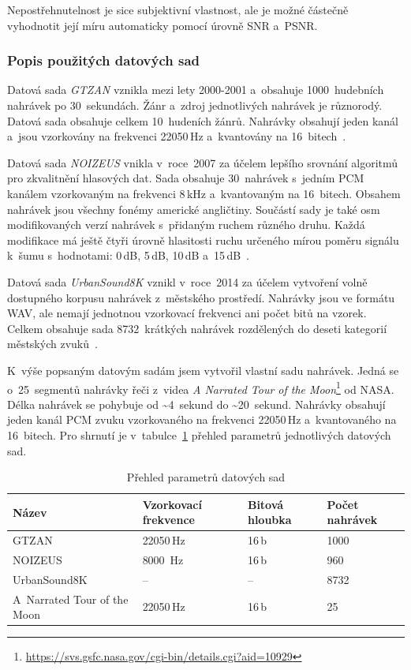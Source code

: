 \noindent Nepostřehnutelnost je sice subjektivní vlastnost, ale je možné
částečně vyhodnotit její míru automaticky pomocí úrovně SNR a~PSNR.

\subsubsection{Popis použitých datových sad}
\label{ssub:dataset-descriptions}

Datová sada \textit{GTZAN} vznikla mezi lety 2000-2001 a~obsahuje
1000~hudebních nahrávek po 30~sekundách. Žánr a~zdroj jednotlivých nahrávek je
různorodý. Datová sada obsahuje celkem 10~hudeních žánrů. Nahrávky obsahují
jeden kanál a~jsou vzorkovány na frekvenci 22050\,Hz a~kvantovány na
16~bitech~\cite{Tzanetakis2001}.

Datová sada \textit{NOIZEUS} vnikla v~roce~2007 za účelem lepšího srovnání
algoritmů pro zkvalitnění hlasových dat. Sada obsahuje 30~nahrávek s~jedním PCM
kanálem vzorkovaným na frekvenci 8\,kHz a~kvantovaným na 16~bitech. Obsahem
nahrávek jsou všechny fonémy americké angličtiny. Součástí sady je také osm
modifikovaných verzí nahrávek s~přidaným ruchem různého druhu. Každá modifikace
má ještě čtyři úrovně hlasitosti ruchu určeného mírou poměru signálu k~šumu
s~hodnotami: 0\,dB, 5\,dB, 10\,dB a~15\,dB~\cite{Hu2006}.

Datová sada \textit{UrbanSound8K} vznikl v~roce~2014 za účelem vytvoření volně
dostupného korpusu nahrávek z~městského prostředí. Nahrávky jsou ve formátu
WAV, ale nemají jednotnou vzorkovací frekvenci ani počet bitů na vzorek. Celkem
obsahuje sada 8732~krátkých nahrávek rozdělených do deseti kategorií městských
zvuků~\cite{Salamon2014}.

K~výše popsaným datovým sadám jsem vytvořil vlastní sadu nahrávek. Jedná se
o~25~segmentů nahrávky řeči z~videa \textit{A Narrated Tour of the
Moon}\footnote{\url{https://svs.gsfc.nasa.gov/cgi-bin/details.cgi?aid=10929}}
od NASA. Délka nahrávek se pohybuje od \textasciitilde4~sekund do
\textasciitilde20~sekund. Nahrávky obsahují jeden kanál PCM zvuku vzorkovaného
na frekvenci 22050\,Hz a~kvantovaného na 16~bitech. Pro shrnutí je
v~tabulce~\ref{tab:datasets} přehled parametrů jednotlivých datových sad.

\begin{table}[H]
    \vskip6pt
    \caption{Přehled parametrů datových sad}
    \vskip6pt
    \centering
    \begin{tabular}{llll}
        \toprule
        Název & Vzorkovací frekvence & Bitová hloubka & Počet nahrávek \\
        \midrule
        GTZAN & 22050\,Hz & 16\,b & 1000 \\
        NOIZEUS & 8000\, Hz & 16\,b & 960 \\
        UrbanSound8K & -- & -- & 8732 \\
        A~Narrated Tour of the Moon & 22050\,Hz & 16\,b & 25 \\
        \bottomrule
    \end{tabular}
    \label{tab:datasets}
\end{table}

